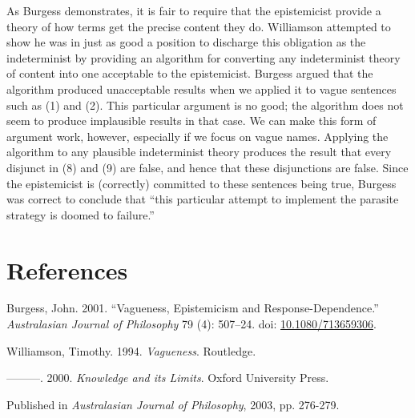 \documentclass[
  11pt,
  letterpaper,
  DIV=11,
  numbers=noendperiod,
  twoside]{scrartcl}
\newlength{\cslhangindent}
\newenvironment{CSLReferences}[2] %
 {\begin{list}{}{%
  \setlength{\itemindent}{0pt}
  \setlength{\leftmargin}{0pt}
  \setlength{\parsep}{0pt}
  \ifodd #1
   \setlength{\leftmargin}{\cslhangindent}
   \setlength{\itemindent}{-1\cslhangindent}
  \fi
  \setlength{\itemsep}{#2\baselineskip}}}
 {\end{list}}
\begin{document}
As Burgess demonstrates, it is fair to require that the epistemicist
provide a theory of how terms get the precise content they do.
Williamson attempted to show he was in just as good a position to
discharge this obligation as the indeterminist by providing an algorithm
for converting any indeterminist theory of content into one acceptable
to the epistemicist. Burgess argued that the algorithm produced
unacceptable results when we applied it to vague sentences such as (1)
and (2). This particular argument is no good; the algorithm does not
seem to produce implausible results in that case. We can make this form
of argument work, however, especially if we focus on vague names.
Applying the algorithm to any plausible indeterminist theory produces
the result that every disjunct in (8) and (9) are false, and hence that
these disjunctions are false. Since the epistemicist is (correctly)
committed to these sentences being true, Burgess was correct to conclude
that ``this particular attempt to implement the parasite strategy is
doomed to failure.''

\section*{References}\label{references}

\protect{}\label{refs}
\begin{CSLReferences}{1}{0}
Burgess, John. 2001. {``Vagueness, Epistemicism and
Response-Dependence.''} \emph{Australasian Journal of Philosophy} 79
(4): 507--24. doi:
\href{https://doi.org/10.1080/713659306}{10.1080/713659306}.

Williamson, Timothy. 1994. \emph{{Vagueness}}. Routledge.

---------. 2000. \emph{{Knowledge and its Limits}}. Oxford University
Press.

\end{CSLReferences}



\noindent Published in\emph{
Australasian Journal of Philosophy}, 2003, pp. 276-279.
\end{document}
